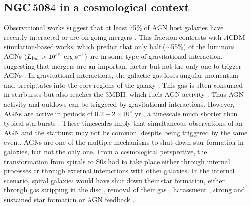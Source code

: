 \documentclass[modern]{CORE-AAS/aastex631}
\begin{document}
\subsection{NGC\,5084 in a cosmological context}
\label{subsec:origin_of_NGC5084}
Observational works suggest that at least 75\% of AGN host galaxies have recently interacted or are on-going mergers \citep{keel+2012mnras420_878}. This fraction contrasts with $\Lambda$CDM simulation-based works, which predict that only half ($\sim$55\%) of the luminous AGNs ($L_{\rm bol} > 10^{45}$ erg s$^{-1}$) are in some type of gravitational interaction, suggesting that mergers are an important factor but not the only one to trigger AGNs \citep{byrnemamahit+2024arXiv2402.05196}.
In gravitational interactions, the galactic gas loses angular momentum and precipitates into the core regions of the galaxy \citep{hopkins+2009apj691_1168}. This gas is often consumed in starbursts but also reaches the SMBH, which fuels AGN activity \citep{dimatteo+2005nat433_604, springel+2005mnras361_776}. Thus AGN activity and outflows can be triggered by gravitational interactions. However, AGNs are active in periods of $0.2-2\times10^{5}$ yr \citep{keel+2012mnras420_878}, a timescale much shorter than typical starbursts \citep[$\tau=10^{7}$ yr,][]{heckman+1993inproceedings_455}. These timescales imply that simultaneous observations of an AGN and the starburst may not be common, despite being triggered by the same event. 
AGNs are one of the multiple mechanisms to shut down star formation in galaxies, but not the only one. From a cosmological perspective, the transformation from spirals to S0s had to take place either through internal processes or through external interactions with other galaxies. In the internal scenario, spiral galaxies would have shut down their star formation, either through gas stripping in the disc \citep{laurikainen+2010mnras405_1089}, removal of their gas \citep[starvation or strangulation,][]{larson+1980apj237_692}, harassment \citep{moore+1996nat379_613}, strong and sustained star formation \citep{kormendy+2004araa42_603} or AGN feedback \citep{chen+2020apj897_102}. \par 
\end{document}
